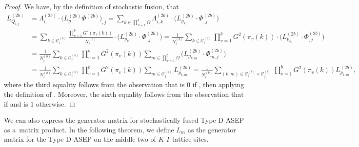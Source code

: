 \documentclass[pdftex]{sigma}
\numberwithin{equation}{section}
\theoremstyle{definition}
\begin{document}
\begin{proof}
We have, by the definition of stochastic fusion, that
\begin{align*}
 L^{(2b)}_{Q_{i,j}} &= \Lambda^{(2b)}_{i,} \cdot \bigl(L^{(2b)}_p \Phi^{(2b)}\bigr)_{,j} = \sum\limits_{k \in \prod_{v=1}^b \Omega} \Lambda^{(2b)}_{i,k} \cdot \bigl(L^{(2b)}_{p_{k,}} \cdot \Phi^{(2b)}_{,j}\bigr) \\
 &= \sum\limits_{k \in \mathcal{C}^{(b)}_i} \frac{\prod_{v=1}^b G^2(\pi_v(k))}{N_i^{(b)}} \cdot \bigl(L^{(2b)}_{p_{k,}} \cdot \Phi^{(2b)}_{,j}\bigr) =\frac{1}{N_i^{(b)}}\sum\limits_{k \in \mathcal{C}^{(b)}_i} \prod_{v=1}^b G^2(\pi_v(k)) \cdot \bigl(L^{(2b)}_{p_{k,}} \cdot \Phi^{(2b)}_{,j}\bigr) \\
 &=\frac{1}{N_i^{(b)}}\sum\limits_{k \in \mathcal{C}^{(b)}_i} \prod_{v=1}^b G^2(\pi_v(k)) \sum\limits_{m \in \prod_{v=1}^b \Omega} \bigl(L^{(2b)}_{p_{k,m}} \cdot \Phi^{(2b)}_{m,j}\bigr)\\
 &=\frac{1}{N_i^{(b)}}\sum\limits_{k \in \mathcal{C}^{(b)}_i} \prod_{v=1}^b G^2(\pi_v(k)) \sum\limits_{m \in \mathcal{C}_j^{(b)}} L^{(2b)}_{p_{k,m}}
 =\frac{1}{N_i^{(b)}}\sum_{(k,m) \in \mathcal{C}^{(b)}_i \times \mathcal{C}^{(b)}_j}\prod_{v=1}^b G^2(\pi_v(k)) L^{(2b)}_{p_{k,m}},
\end{align*}
where the third equality follows from the observation that  is $0$ if , then applying the definition of . Moreover, the sixth equality follows from the observation that  if  and is 1 otherwise.
\end{proof}

We can also express the generator matrix for stochastically fused Type D ASEP as a~matrix product. In the following theorem, we define $L_m$ as the generator matrix for the Type D ASEP on the middle two of $K$ $\Gamma$-lattice sites.
\end{document}
